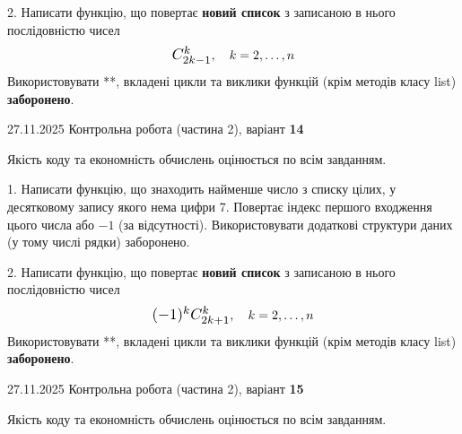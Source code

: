 \documentclass[11pt, ukrainian]{article}
\begin{document}
{{{{{{{{{{{{{\begin {large}

2. 
Написати функцію, що повертає \textbf{новий список} з записаною в нього послідовністю чисел
$$\scalebox{1.2}{$C_{2k-1}^{k}$}, \quad k=2,\ldots,n$$
Використовувати **, вкладені цикли та виклики функцій (крім методів класу list) \textbf{заборонено}.

\end{large}
\newpage
{{27.11.2025 Контрольна робота  (частина 2), варіант  \No \textbf { 14 }\par}}


{
\begin {large}
Якість коду та економність обчислень оцінюється по всім завданням.


1. Написати функцію, що знаходить найменше число з списку цілих, у десятковому запису якого нема цифри 7. Повертає індекс першого входження цього числа або $-1$ (за відсутності). Використовувати додаткові структури даних (у тому числі рядки) заборонено.


2. 
Написати функцію, що повертає \textbf{новий список} з записаною в нього послідовністю чисел
$$\scalebox{1.2}{$(-1)^{k}C_{2k+1}^{k}$}, \quad k=2,\ldots,n$$
Використовувати **, вкладені цикли та виклики функцій (крім методів класу list) \textbf{заборонено}.

\end{large}
\newpage
{{27.11.2025 Контрольна робота  (частина 2), варіант  \No \textbf { 15 }\par}}


{
\begin {large}
Якість коду та економність обчислень оцінюється по всім завданням.



\end{large}}}}}}}}}}}}}}}}
\end{document}
